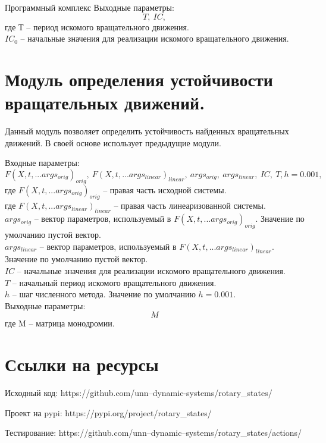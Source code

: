 \begin{chapter}{Программный комплекс}
Выходные параметры: $$T,  \ IC,$$
где $\text{Т}$ -- период искомого вращательного движения. \\
$IC_0$ -- начальные значения для реализации искомого вращательного движения. \\


\section{Модуль определения устойчивости вращательных движений.}
Данный модуль позволяет определить устойчивость найденных вращательных движений.
В своей основе использует предыдущие модули.

Входные параметры: $$F(X, t, ...args_{orig})_{orig}, \ F(X, t, ...args_{linear})_{linear}, \ args_{orig}, \ args_{linear}, \ IC, \ T , h=0.001,$$
где $F(X, t, ...args_{orig})_{orig}$ -- правая часть исходной системы. \\
где $F(X, t, ...args_{linear})_{linear}$ -- правая часть линеаризованной  системы. \\
$args_{orig}$ -- вектор параметров, используемый в $F(X, t, ...args_{orig})_{orig}$. Значение по умолчанию пустой вектор. \\ 
$args_{linear}$ -- вектор параметров, используемый в $F(X, t, ...args_{linear})_{linear}$. Значение по умолчанию пустой вектор. \\
$IC$ -- начальные значения для реализации искомого вращательного движения.\\
$T$ -- начальный период искомого вращательного движения.\\
$h$ -- шаг численного метода. Значение по умолчанию $h = 0.001$. \\

Выходные параметры: $$M$$
где $\text{M}$ -- матрица монодромии.

\section{Ссылки на ресурсы}
Исходный код: https://github.com/unn--dynamic-systems/rotary\_states/

Проект на pypi: https://pypi.org/project/rotary\_states/

Тестирование: https://github.com/unn--dynamic--systems/rotary\_states/actions/

\end{chapter}